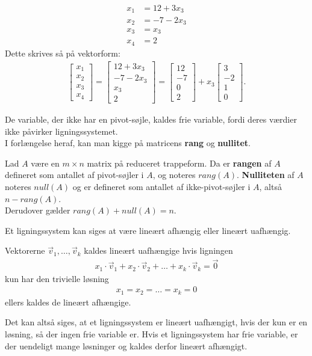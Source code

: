\begin{eks}
\begin{align*}
x_1 &= 12 + 3x_3 \\
x_2 &= -7 - 2x_3 \\
x_3 &= x_3 \\
x_4 &= 2
\end{align*}
Dette skrives så på vektorform:
\begin{align*}
\begin{bmatrix}
x_1 \\
x_2 \\
x_3 \\
x_4 
\end{bmatrix}
= \begin{bmatrix}
12 + 3x_3 \\
-7 - 2x_3 \\
x_3 \\
2
\end{bmatrix}
= \begin{bmatrix}
12 \\
-7 \\
0 \\
2
\end{bmatrix}
+ x_3 \begin{bmatrix}
3 \\
-2 \\
1 \\
0
\end{bmatrix}.
\end{align*}
\end{eks}

De variable, der ikke har en pivot-søjle, kaldes frie variable, fordi deres værdier ikke påvirker ligningssystemet. \\

I forlængelse heraf, kan man kigge på matricens \textbf{rang} og \textbf{nullitet}. 
\begin{defn}
Lad $A$ være en $m \times n$ matrix på reduceret trappeform. 
Da er \textbf{rangen} af $A$ defineret som antallet af pivot-søjler i $A$, og noteres $rang(A)$. 
\textbf{Nulliteten} af $A$ noteres $null(A)$ og er defineret som antallet af ikke-pivot-søjler i $A$, altså $n - rang(A)$. \\
Derudover gælder $rang(A) + null(A) = n$.
\end{defn}


Et ligningssystem kan siges at være lineært afhængig eller lineært uafhængig.

\begin{defn}
Vektorerne $\vec{v}_1, \dots ,\vec{v}_k$ kaldes lineært uafhængige hvis ligningen
\begin{align*}
x_1 \cdot \vec{v}_1+x_2 \cdot \vec{v}_2 + \dots + x_k \cdot \vec{v}_k =  \vec{0}
\end{align*}
kun har den trivielle løsning
\begin{align*}
x_1=x_2= \dots =x_k=0
\end{align*}
ellers kaldes de lineært afhængige.
\label{defn_lin_uafh}
\end{defn}

Det kan altså siges, at et ligningssystem er lineært uafhængigt, hvis der kun er en løsning, så der ingen frie variable er. Hvis et ligningssystem har frie variable, er der uendeligt mange løsninger og kaldes derfor lineært afhængigt. 


